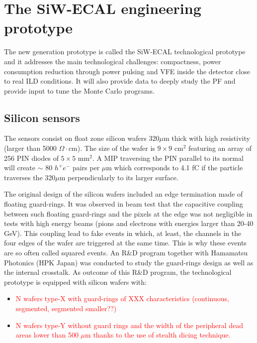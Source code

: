 \documentclass[a4paper,11pt]{article}
\newcommand{\todo}[1]{\textcolor{red}{{#1}}}
\begin{document}
\section{The SiW-ECAL engineering prototype}


The new generation prototype is called the SiW-ECAL technological prototype and it addresses the main technological challenges: compactness,
power consumption reduction through power pulsing and VFE inside the detector close to real ILD conditions.
It will also provide data to deeply study the PF and provide input to tune the Monte Carlo programs.

\subsection{Silicon sensors}
\label{sec:wafers}

The sensors consist on float zone silicon wafers 320$\mu$m thick with high resistivity (larger than 5000 $\Omega\cdot$cm). The size of the wafer is $9\times9$ cm$^{2}$ featuring an array of 256 PIN diodes of $5\times5$ mm$^{2}$. A MIP traversing the PIN parallel to its normal will create $\sim$ 80 $h^{+}e^{-}$ pairs per $\mu$m which corresponds to 4.1 fC if the particle traverses the 320$\mu$m perpendicularly to its larger surface.

The original design of the silicon wafers included an edge termination made of floating guard-rings.
It was observed in beam test\cite{Cornat:2015eoa,Cornat:2009zz} that the capacitive coupling between such floating guard-rings 
and the pixels at the edge was not negligible in tests with high energy beams (pions and electrons with energies larger than 20-40 GeV).
This coupling lead to fake events in which, at least,
the channels in the four edges of the wafer are triggered at the same time. 
This is why these events are so often called squared events. 
An R\&D program together with Hamamatsu Photonics (HPK Japan) was conducted to study the guard-rings design 
as well as the internal crosstalk. As outcome of this R\&D program, the technological prototype 
is equipped with silicon wafers with:

\begin{itemize}
\item \todo{N wafers type-X with guard-rings of XXX characteristics (continuous, segmented, segmented smaller??)}
\item \todo{N wafers type-Y without guard rings and the width of the peripheral dead areas lower than 500 $\mu$m thanks to the use of stealth dicing technique.}
\end{itemize}
\end{document}
